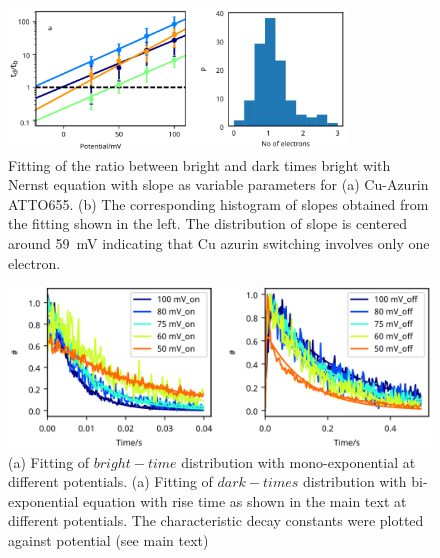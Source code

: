 \squeezeup
\begin{figure}[ht]
  \centering
  \includegraphics[width=0.8\textwidth]{SI_potential_slope}
  \makeatletter
  \renewcommand{\fnum@figure}{\figurename~S\thefigure}
  \makeatother
  \caption{Fitting of the ratio between bright and dark times bright with Nernst equation with slope as variable parameters for  (a) Cu-Azurin ATTO655. 
  (b) The corresponding histogram of slopes obtained from the fitting shown in the left.
  The distribution of slope is centered around \SI{59}{\mV} indicating that Cu azurin switching  involves only one electron.}
  \label{SIfig:potential_slope}
\end{figure}
\squeezeup
\begin{figure}[ht]
  \centering
  \includegraphics[width=\textwidth]{rate_fit_all_potential}
  \makeatletter
  \renewcommand{\fnum@figure}{\figurename~S\thefigure}
  \makeatother
  \caption{(a) Fitting of $bright-time$ distribution with mono-exponential at different potentials.
  (a) Fitting of $dark-times$ distribution with bi-exponential equation with rise time as shown in the main text at different potentials.
  The characteristic decay constants were plotted against potential (see main text)}
  \label{SIfig: rate_fit_all_potential}
\end{figure}

\clearpage

